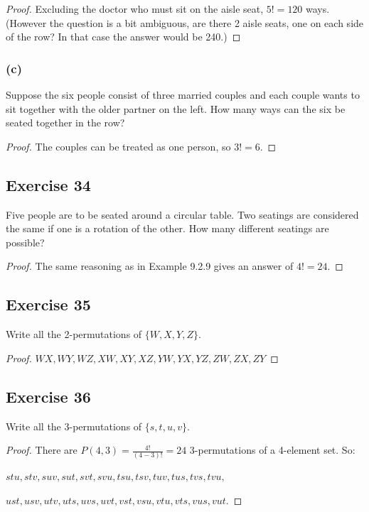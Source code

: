 \documentclass[14pt]{extarticle}
\newcommand{\dps}{\displaystyle}
\begin{document}
\begin{proof}
     Excluding the doctor who must sit on the aisle seat, \(5! = 120\) ways. (However the question is a bit ambiguous, are
     there 2 aisle seats, one on each side of the row? In that case the answer would be 240.)
\end{proof}

\subsubsection{(c)}
Suppose the six people consist of three married couples and each couple wants to sit together with the older partner on
the left. How many ways can the six be seated together in the row?

\begin{proof}
     The couples can be treated as one person, so \(3! = 6\).
\end{proof}

\subsection{Exercise 34}
Five people are to be seated around a circular table. Two seatings are considered the same if one is a rotation of
the other. How many different seatings are possible?

\begin{proof}
     The same reasoning as in Example 9.2.9 gives an answer of \(4! = 24\).
\end{proof}

\subsection{Exercise 35}
Write all the 2-permutations of \(\{W, X, Y, Z\}\).

\begin{proof}
     \(WX, WY, WZ, XW, XY, XZ, YW, YX, YZ, ZW, ZX, ZY\)
\end{proof}

\subsection{Exercise 36}
Write all the 3-permutations of \(\{s, t, u, v\}\).

\begin{proof}
     There are \(P(4,3) = \dps\frac{4!}{(4-3)!} = 24\) 3-permutations of a 4-element set. So:

     \(stu, stv, suv, sut, svt, svu, tsu, tsv, tuv, tus, tvs, tvu,\)

     \(ust, usv, utv, uts, uvs, uvt, vst, vsu, vtu, vts, vus, vut.\)
\end{proof}
\end{document}
